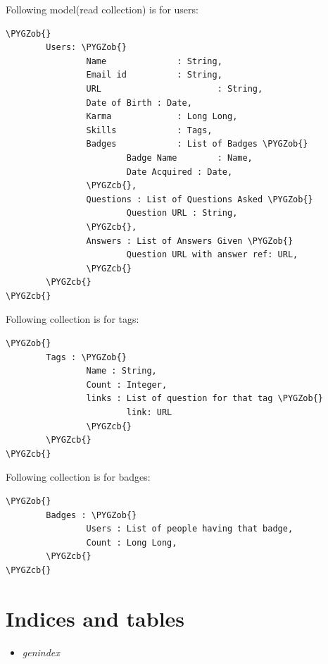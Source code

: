 \documentclass[letterpaper,10pt,english]{sphinxmanual}
\def\PYGZob{\char`\{}
\def\PYGZcb{\char`\}}
\begin{document}
Following model(read collection) is for users:

\begin{Verbatim}[commandchars=\\\{\}]
\PYGZob{}
        Users: \PYGZob{}
                Name              : String,
                Email id          : String,
                URL                       : String,
                Date of Birth : Date,
                Karma             : Long Long,
                Skills            : Tags,
                Badges            : List of Badges \PYGZob{}
                        Badge Name        : Name,
                        Date Acquired : Date,
                \PYGZcb{},
                Questions : List of Questions Asked \PYGZob{}
                        Question URL : String,
                \PYGZcb{},
                Answers : List of Answers Given \PYGZob{}
                        Question URL with answer ref: URL,
                \PYGZcb{}
        \PYGZcb{}
\PYGZcb{}
\end{Verbatim}

Following collection is for tags:

\begin{Verbatim}[commandchars=\\\{\}]
\PYGZob{}
        Tags : \PYGZob{}
                Name : String,
                Count : Integer,
                links : List of question for that tag \PYGZob{}
                        link: URL
                \PYGZcb{}
        \PYGZcb{}
\PYGZcb{}
\end{Verbatim}

Following collection is for badges:

\begin{Verbatim}[commandchars=\\\{\}]
\PYGZob{}
        Badges : \PYGZob{}
                Users : List of people having that badge,
                Count : Long Long,
        \PYGZcb{}
\PYGZcb{}
\end{Verbatim}


\chapter{Indices and tables}
\label{index:indices-and-tables}\begin{itemize}
\item {} 
\emph{genindex}

\end{itemize}



\renewcommand{\indexname}{Index}
\printindex
\end{document}
